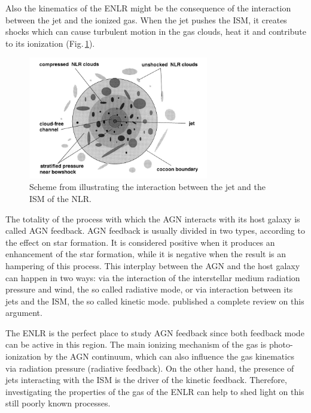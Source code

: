 \documentclass[../main.tex]{subfiles}
\begin{document}
Also the kinematics of the ENLR might be the consequence of the interaction between the jet and the ionized gas.
When the jet pushes the ISM, it creates shocks which can
cause turbulent motion in the gas clouds, heat it and contribute to its ionization \citep[e.g.][]{Steffen97,Morse98,Rodriguez05,Contini12,Congiu17} (Fig.\,\ref{fig:interaction}).

\begin{figure}
\centering
\includegraphics[width=0.7\textwidth]{PhD_thesis/images/Jet-ism.png} 
\caption[]{Scheme from \citet{Steffen97} illustrating the interaction between the jet and the ISM of the NLR.}
\label{fig:interaction}
\end{figure}

The totality of the process with which the AGN interacts with its host galaxy is called AGN feedback.
AGN feedback is usually divided in two types, according to the effect on star formation.
It is considered positive when it produces an enhancement of the star formation, while it is negative when the result is an hampering of this process.
This interplay between the AGN and the host galaxy can happen in two ways: via the interaction of the interstellar medium radiation pressure and wind, the so called radiative mode, or via interaction between its jets and the ISM, the so called kinetic mode.
\citet{Fabian12} published a complete review on this argument.

The ENLR is the perfect place to study AGN feedback since both feedback mode can be active in this region.
The main ionizing mechanism of the gas is photo-ionization by the AGN continuum, which can also influence the gas kinematics via radiation pressure (radiative feedback).
On the other hand, the presence of jets interacting with the ISM is the driver of the kinetic feedback.
Therefore, investigating the properties of the gas of the ENLR can help to shed light on this still poorly known processes.



























\biblio
\end{document}
